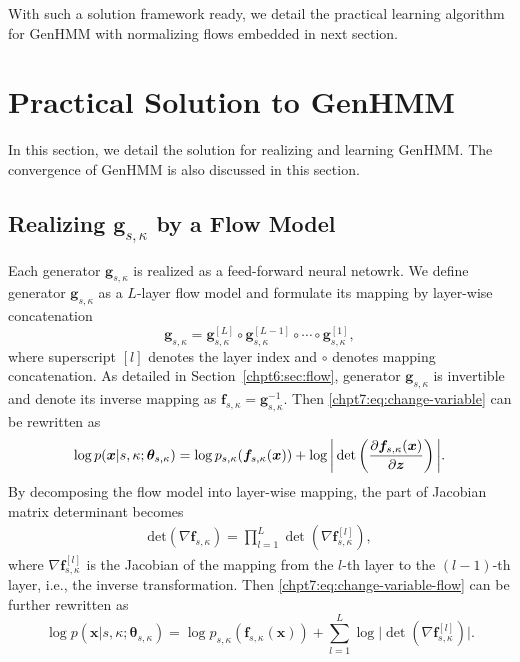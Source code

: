 With such a solution framework ready, we detail the practical learning algorithm for GenHMM with normalizing flows embedded in next section.

\section{Practical Solution to GenHMM}

In this section, we detail the solution for realizing and learning GenHMM. The convergence of GenHMM is also discussed in this section.


\subsection{Realizing $\bm{g}_{s,\kappa}$ by a Flow Model}
Each generator $\bm{g}_{s,\kappa}$ is realized as a feed-forward neural netowrk.
We define generator $\bm{g}_{s,\kappa}$ as a $L$-layer flow model and formulate its mapping by layer-wise concatenation
\begin{equation}
\bm{g}_{s,\kappa}=\bm{g}_{s,\kappa}^{[L]}\circ \bm{g}_{s,\kappa}^{[L-1]}\circ \cdots \circ \bm{g}_{s,\kappa}^{[1]},
\end{equation}
where superscript $[l]$ denotes the layer index and $\circ$ denotes mapping concatenation. As detailed in Section~\ref{chpt6:sec:flow}, generator $\bm{g}_{s,\kappa}$ is invertible and denote its inverse mapping as $\bm{f}_{s,\kappa}=\bm{g}_{s,\kappa}^{-1}$. Then \eqref{chpt7:eq:change-variable} can be rewritten as
\begin{equation}\label{chpt7:eq:change-variable-flow}
  \log{p(\bm{x}| s, \kappa; \bm{\theta}_{s, \kappa})} = \log{p_{s,\kappa}(\bm{f}_{s, \kappa}(\bm{x}))} + \log{\bigg| \det\left(  \frac{ \partial \bm{f}_{s,\kappa}(\bm{x})}{\partial \bm{z}}  \right)\bigg|}.
\end{equation}
By decomposing the flow model into layer-wise mapping, the part of Jacobian matrix determinant becomes
\begin{equation}\label{eq:cat-jacobian}
  \begin{array}{rl}
    \mathrm{det}(\nabla{\bm{f}_{s,\kappa}}) = \prod_{l=1}^L \det (\nabla{\bm{f}_{s,\kappa}^{[l]}}),
  \end{array}
\end{equation}
where $\nabla{\bm{f}_{s,\kappa}^{[l]}}$ is the Jacobian of the mapping from the $l$-th layer to the $(l-1)$-th layer, i.e., the inverse transformation.
Then \eqref{chpt7:eq:change-variable-flow} can be further rewritten as
\begin{equation}\label{chpt7:eq:change-variable-flow-layer}
  \log{p(\bm{x}| s, \kappa; \bm{\theta}_{s, \kappa})} = \log{p_{s,\kappa}(\bm{f}_{s, \kappa}(\bm{x}))} + \sum_{l=1}^{L}\log{\bigg| \det\left(\nabla{\bm{f}_{s,\kappa}^{[l]}}\right)\bigg|}.
\end{equation}


